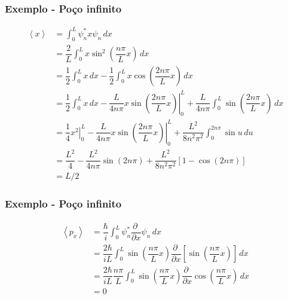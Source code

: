 \documentclass[12pt,brazil]{beamer}
\begin{document}

\begin{frame}
  \frametitle{Exemplo - Poço infinito}  
  \fontsize{9pt}{11pt}\selectfont
  
  \begin{align*}
    \left< x \right>& = \int_0^L \psi_n^* x \psi_n\,dx\\
              &= \dfrac{2}{L}\int_0^L x\sin^2 \left( \dfrac{n\pi}{L}x \right)\,dx\\
              &=\dfrac{1}{2}\int_0^L x\, dx - \dfrac{1}{2}\int_0^L x\cos\left( \dfrac{2n\pi}{L}x \right)\,dx\\
              &=\dfrac{1}{2}\int_0^L x\, dx - \left. \dfrac{L}{4n\pi}x\sin\left( \dfrac{2n\pi}{L}x \right) \right|_0^L + \dfrac{L}{4n\pi}\int_0^L\sin\left( \dfrac{2n\pi}{L}x \right)\,dx\\
            &=\dfrac{1}{4}\left. x^2\right|_0^L - \left. \dfrac{L}{4n\pi}x\sin\left( \dfrac{2n\pi}{L}x \right) \right|_0^L + \dfrac{L^2}{8n^2\pi^2}\int_0^{2n\pi}\sin u\,du\\
            &= \dfrac{L^2}{4} - \dfrac{L^2}{4n\pi}\sin\left(2n\pi\right)+\dfrac{L^2}{8n^2\pi^2}\left[ 1 -\cos\left( 2n\pi \right) \right]\\
            &= L/2
  \end{align*}
  
\end{frame}



\begin{frame}
  \frametitle{Exemplo - Poço infinito}  
  \fontsize{9pt}{11pt}\selectfont
  
    \begin{align*}
            \left< p_x \right>& = \dfrac{\hbar}{i}\int_0^L \psi_n^* \dfrac{\partial\;}{\partial x} \psi_n\,dx\\
            &= \dfrac{2\hbar}{iL}\int_0^L \sin \left( \dfrac{n\pi}{L}x \right)\dfrac{\partial\;}{\partial x}\left[ \sin \left( \dfrac{n\pi}{L}x \right) \right]\,dx\\
            &= \dfrac{2\hbar}{iL}\dfrac{n\pi}{L}\int_0^L \sin \left( \dfrac{n\pi}{L}x \right)\dfrac{\partial\;}{\partial x}\cos \left( \dfrac{n\pi}{L}x \right)\,dx\\
            &= 0
          \end{align*}
  
\end{frame}
\end{document}
